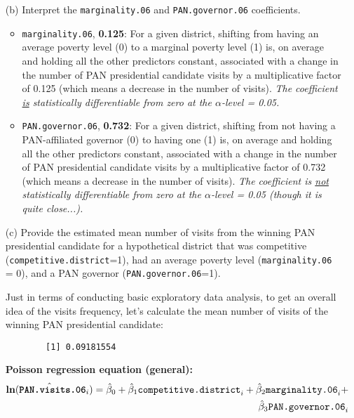\documentclass[12pt,letterpaper]{article}
\begin{document}
\begin{enumerate}
	\item [(b)]
	Interpret the \texttt{marginality.06} and \texttt{PAN.governor.06} coefficients.
\begin{itemize}
    \item \texttt{marginality.06}, \textbf{0.125}: For a given district, shifting from having an average poverty level (0) to a marginal poverty level (1) is, on average and holding all the other predictors constant, associated with a change in the number of PAN presidential candidate visits by a multiplicative factor of 0.125 (which means a decrease in the number of visits). \textit{The coefficient \underline{is} statistically differentiable from zero at the $\alpha$-level = 0.05.}
    \item \texttt{PAN.governor.06}, \textbf{0.732}: For a given district, shifting from not having a PAN-affiliated governor (0) to having one (1) is, on average and holding all the other predictors constant, associated with a change in the number of PAN presidential candidate visits by a multiplicative factor of 0.732 (which means a decrease in the number of visits). \textit{The coefficient is \underline{not} statistically differentiable from zero at the $\alpha$-level = 0.05 (though it is quite close...).}
\end{itemize}


 
	\item [(c)]
	Provide the estimated mean number of visits from the winning PAN presidential candidate for a hypothetical district that was competitive (\texttt{competitive.district}=1), had an average poverty level (\texttt{marginality.06} = 0), and a PAN governor (\texttt{PAN.governor.06}=1).
	
	Just in terms of conducting basic exploratory data analysis, to get an overall idea of the visits frequency, let's calculate the mean number of visits of the winning PAN presidential candidate:
	
		 
	
	\begin{verbatim}
		[1] 0.09181554
	\end{verbatim}
	
\vspace{.25cm}
\textbf{Poisson regression equation (general):}
\[
\begin{split}
\hat{\textbf{{ln}}(\textbf{\texttt{PAN.visits.06}}_i)} = \hat{\beta}_0 + \hat{\beta}_1 \texttt{competitive.district}_i + \hat{\beta}_2 \texttt{marginality.06}_i + \\
\hat{\beta}_3 \texttt{PAN.governor.06}_i
\end{split}
\]


\end{enumerate}
\end{document}
